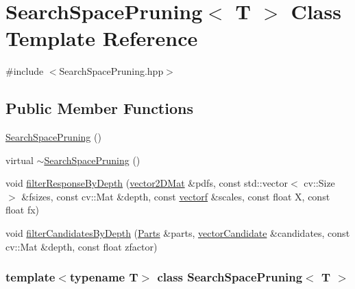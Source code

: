 \hypertarget{classSearchSpacePruning}{\section{\-Search\-Space\-Pruning$<$ \-T $>$ \-Class \-Template \-Reference}
\label{classSearchSpacePruning}
}


{\ttfamily \#include $<$\-Search\-Space\-Pruning.\-hpp$>$}

\subsection*{\-Public \-Member \-Functions}
\begin{DoxyCompactItemize}
\item 
\hyperlink{classSearchSpacePruning_acb47c8b784d33cbad5ffde38e689316b}{\-Search\-Space\-Pruning} ()
\item 
virtual \hyperlink{classSearchSpacePruning_a78ec6942ec11b681a1b65faf7857af9d}{$\sim$\-Search\-Space\-Pruning} ()
\item 
void \hyperlink{classSearchSpacePruning_a4f71ccfb6a90e5631467a1b5152c8fef}{filter\-Response\-By\-Depth} (\hyperlink{types_8hpp_a33cacb85be7b8df3dc0b67d5d849f4cc}{vector2\-D\-Mat} \&pdfs, const std\-::vector$<$ cv\-::\-Size $>$ \&fsizes, const cv\-::\-Mat \&depth, const \hyperlink{types_8hpp_a4da5db3ee9e284f719ef5764dbadffc8}{vectorf} \&scales, const float \-X, const float fx)
\item 
void \hyperlink{classSearchSpacePruning_a46a0647b44efb07ffcb61558840e4ce3}{filter\-Candidates\-By\-Depth} (\hyperlink{classParts}{\-Parts} \&parts, \hyperlink{types_8hpp_a04eefdf70d6c6b8effb5170271f1db05}{vector\-Candidate} \&candidates, const cv\-::\-Mat \&depth, const float zfactor)
\end{DoxyCompactItemize}
\subsubsection*{template$<$typename T$>$ class Search\-Space\-Pruning$<$ T $>$}



